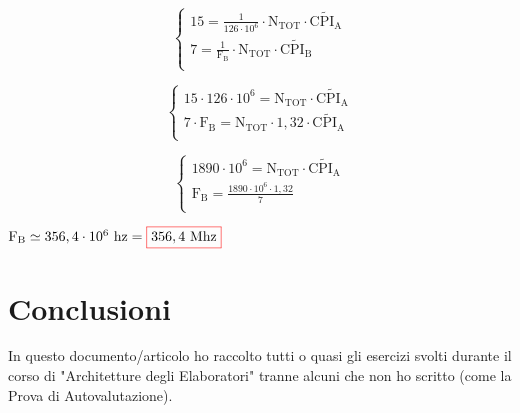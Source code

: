 \noindent\begin{minipage}{.5\linewidth}
\begin{equation*}
\begin{cases}
15 = \frac{1}{126 \cdot 10^6} \cdot \text{N}_\text{TOT} \cdot \widetilde{\text{CPI}_\text{A}} \\
7 = \frac{1}{\text{F}_\text{B}} \cdot \text{N}_\text{TOT} \cdot \widetilde{\text{CPI}_\text{B}} \\
\end{cases}
\end{equation*}
\end{minipage}
\begin{minipage}{.35\linewidth}
\begin{equation*}
	\begin{cases}
		15 \cdot 126 \cdot 10^6 = \text{N}_\text{TOT} \cdot \widetilde{\text{CPI}_\text{A}} \\
		7 \cdot \text{F}_\text{B} = \text{N}_\text{TOT} \cdot 1,32 \cdot \widetilde{\text{CPI}_\text{A}} \\
	\end{cases}
\end{equation*}
\end{minipage}

\begin{equation*}
\begin{cases}
1890 \cdot 10^6 = \text{N}_\text{TOT} \cdot \widetilde{\text{CPI}_\text{A}} \\
\text{F}_\text{B} = \frac{1890 \cdot 10^6 \cdot 1,32}{7} \\
\end{cases}
\end{equation*}

$ \text{F}_\text{B} \simeq 356,4 \cdot 10^6 \text{ hz} = \color{red}\boxed{\normalcolor 356,4 \text{ Mhz}} $ \\


\newpage

\section{Conclusioni}

\flushright
\date{13, Dicembre 2020} \break

\centering

\textsf{{\normalsize In questo documento/articolo ho raccolto tutti o quasi gli esercizi svolti durante il corso di "Architetture degli Elaboratori" tranne alcuni che non ho scritto (come la Prova di Autovalutazione).}} \\

